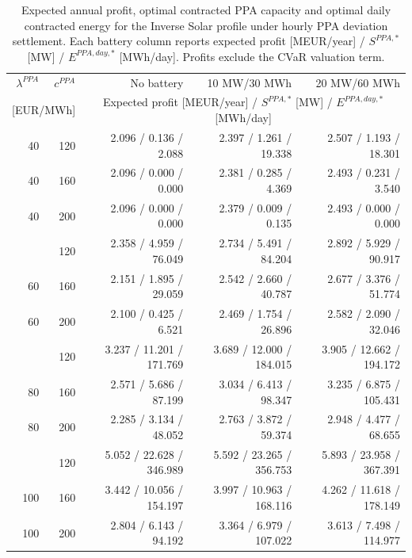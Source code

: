 \begin{table}[htbp]
\centering
\small
\caption{Expected annual profit, optimal contracted PPA capacity and optimal daily contracted energy for the Inverse Solar profile under hourly PPA deviation settlement. Each battery column reports expected profit [MEUR/year] / $S^{PPA,*}$ [MW] / $E^{PPA,day,*}$ [MWh/day]. Profits exclude the CVaR valuation term.}
\label{tab:battery_sensitivity_inverse_solar}
\begin{tabular*}{\textwidth}{@{\extracolsep{\fill}}rrrrr@{}}
\toprule
$\lambda^{PPA}$ & $c^{PPA}$ & No battery & 10 MW/30 MWh & 20 MW/60 MWh \\
\multicolumn{2}{c}{[EUR/MWh]} & \multicolumn{3}{c}{Expected profit [MEUR/year] / $S^{PPA,*}$ [MW] / $E^{PPA,day,*}$ [MWh/day]} \\
\midrule
40 & 120 & 2.096 / 0.136 / 2.088 & 2.397 / 1.261 / 19.338 & 2.507 / 1.193 / 18.301 \\
40 & 160 & 2.096 / 0.000 / 0.000 & 2.381 / 0.285 / 4.369 & 2.493 / 0.231 / 3.540 \\
40 & 200 & 2.096 / 0.000 / 0.000 & 2.379 / 0.009 / 0.135 & 2.493 / 0.000 / 0.000 \\
\addlinespace
60 & 120 & 2.358 / 4.959 / 76.049 & 2.734 / 5.491 / 84.204 & 2.892 / 5.929 / 90.917 \\
60 & 160 & 2.151 / 1.895 / 29.059 & 2.542 / 2.660 / 40.787 & 2.677 / 3.376 / 51.774 \\
60 & 200 & 2.100 / 0.425 / 6.521 & 2.469 / 1.754 / 26.896 & 2.582 / 2.090 / 32.046 \\
\addlinespace
80 & 120 & 3.237 / 11.201 / 171.769 & 3.689 / 12.000 / 184.015 & 3.905 / 12.662 / 194.172 \\
80 & 160 & 2.571 / 5.686 / 87.199 & 3.034 / 6.413 / 98.347 & 3.235 / 6.875 / 105.431 \\
80 & 200 & 2.285 / 3.134 / 48.052 & 2.763 / 3.872 / 59.374 & 2.948 / 4.477 / 68.655 \\
\addlinespace
100 & 120 & 5.052 / 22.628 / 346.989 & 5.592 / 23.265 / 356.753 & 5.893 / 23.958 / 367.391 \\
100 & 160 & 3.442 / 10.056 / 154.197 & 3.997 / 10.963 / 168.116 & 4.262 / 11.618 / 178.149 \\
100 & 200 & 2.804 / 6.143 / 94.192 & 3.364 / 6.979 / 107.022 & 3.613 / 7.498 / 114.977 \\
\bottomrule
\end{tabular*}
\end{table}

